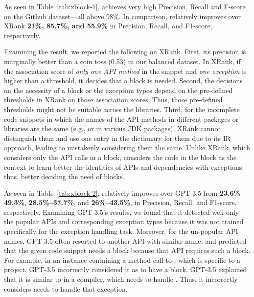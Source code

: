 
As seen in Table~\ref{tab:xblock-1}, {\tool} achieves very high
Precision, Recall and F-score on the Github dataset---all above
98\%.
In comparison, {\tool} relatively improves over XRank {\bf 21\%, 85.7\%,
and 55.9\%} in Precision, Recall, and F1-score, respectively.

Examining the result, we reported the following on XRank. First,
its precision is marginally better than a coin toss (0.53) in our
balanced dataset. In XRank, if the association score of {\em only one
  API method} in the snippet and {\em one exception} is higher than a
threshold, it decides that a  block is needed.
%
Second, the decisions on the necessity of a  block or
the exception types depend on the pre-defined thresholds in XRank on
those association scores. Thus, those pre-defined thresholds might not
be suitable across the libraries. Third, for the incomplete code
snippets in which the names of the API methods in different packages
or libraries are the same (e.g.,  or  in
various JDK packages), XRank cannot distinguish them and use one entry
in the dictionary for them due to its IR approach, leading to
mistakenly considering them the same. Unlike XRank, which
considers only the API calls in a  block,
{\tool} considers the code in the block as the context to learn better
the identities of APIs and dependencies with exceptions,
thus, better deciding the need of  blocks.



As seen in Table~\ref{tab:xblock-2}, {\tool} relatively improves over
GPT-3.5 from {\bf 23.6\%--49.3\%}, {\bf 28.5\%--37.7\%}, and {\bf
  26\%--43.5\%}, in Precision, Recall, and F1-score,
respectively. Examining GPT-3.5's results, we found that it detected
well only the popular APIs and corresponding exception types because
it was not trained specifically for the exception handling
task. Moreover, for the un-popular API names, GPT-3.5 often resorted
to another API with similar name, and predicted that the given code
snippet needs a  block because that API requires such
a block. For example, in an instance containing a method call to
, which is specific to a project,
GPT-3.5 incorrectly considered it as to have a 
block. GPT-3.5 explained that it is similar to 
in a compiler, which needs to handle
. Thus, it incorrectly considers
 needs to handle that exception.

